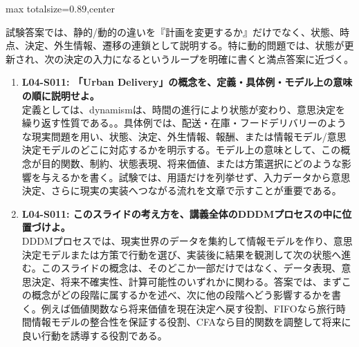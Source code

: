 \begin{minipage}[t]{0.58\textwidth}
\begin{adjustbox}{max totalsize={\textwidth}{0.89\textheight},center}
\begin{minipage}{\textwidth}
試験答案では、静的/動的の違いを『計画を変更するか』だけでなく、状態、時点、決定、外生情報、遷移の連鎖として説明する。特に動的問題では、状態が更新され、次の決定の入力になるというループを明確に書くと満点答案に近づく。\par{}\begin{enumerate}\item \textbf{L04-S011: 「Urban Delivery」の概念を、定義・具体例・モデル上の意味の順に説明せよ。}\\定義としては、dynamismは、時間の進行により状態が変わり、意思決定を繰り返す性質である。。具体例では、配送・在庫・フードデリバリーのような現実問題を用い、状態、決定、外生情報、報酬、または情報モデル/意思決定モデルのどこに対応するかを明示する。モデル上の意味として、この概念が目的関数、制約、状態表現、将来価値、または方策選択にどのような影響を与えるかを書く。試験では、用語だけを列挙せず、入力データから意思決定、さらに現実の実装へつながる流れを文章で示すことが重要である。\item \textbf{L04-S011: このスライドの考え方を、講義全体のDDDMプロセスの中に位置づけよ。}\\DDDMプロセスでは、現実世界のデータを集約して情報モデルを作り、意思決定モデルまたは方策で行動を選び、実装後に結果を観測して次の状態へ進む。このスライドの概念は、そのどこか一部だけではなく、データ表現、意思決定、将来不確実性、計算可能性のいずれかに関わる。答案では、まずこの概念がどの段階に属するかを述べ、次に他の段階へどう影響するかを書く。例えば価値関数なら将来価値を現在決定へ戻す役割、FIFOなら旅行時間情報モデルの整合性を保証する役割、CFAなら目的関数を調整して将来に良い行動を誘導する役割である。\end{enumerate}
\end{minipage}
\end{adjustbox}
\end{minipage}


